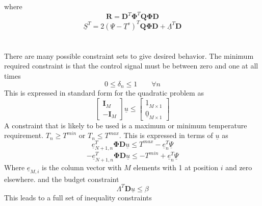 \documentclass[11pt]{article}
\begin{document}
where
\begin{equation}
\mathbf{R}=\mathbf{D}^{T}\mathbf{\Phi}^{T}\mathbf{Q}\mathbf{\Phi}\mathbf{D}
\end{equation}
\begin{equation}
\underline{S}^{T}=2(\underline{\Psi}-\underline{T}^s)^{T}\mathbf{Q}\mathbf{\Phi}\mathbf{D}+\underline{\Lambda}^{T} \mathbf{D}
\end{equation}
\section{}
There are many possible constraint sets to give desired behavior. The minimum required constraint is that the control signal must be between zero and one at all times
\begin{equation}
0 \leq \delta_{n} \leq 1 \qquad \forall n
\end{equation}
This is expressed in standard form for the quadratic problem as
\begin{equation}
\left[
\begin{array}{c}
\mathbf{I}_{M} \\ \hline
- \mathbf{I}_{M} 
\end{array}\right]\underline{u} \leq \left[\begin{array}{c}
\underline{1}_{M \times 1} \\ \hline
\underline{0}_{M \times 1}
\end{array}\right]
\end{equation}
A constraint that is likely to be used is a maximum or minimum temperature requirement. $T_{n} \geq T^{min}$ or $T_{n} \leq T^{max}$. This is expressed in terms of $\underline{u}$ as
\begin{equation}
\underline{e}_{N+1,n}^{T}  \mathbf{\Phi D} \underline{u} \leq T^{max}-\underline{e}_{n}^{T} \underline{\Psi}
\end{equation}
\begin{equation}
-\underline{e}_{N+1,n}^{T} \mathbf{\Phi D} \underline{u} \leq -T^{min}+\underline{e}_{n}^{T} \underline{\Psi}
\end{equation}
Where $\underline{e}_{M,i}$ is the column vector with $M$ elements with 1 at position $i$ and zero elsewhere.
and the budget constraint
\begin{equation}
\Lambda^{T} \mathbf{D} \underline{u} \leq \beta
\end{equation}
This leads to a full set of inequality constraints
\end{document}
